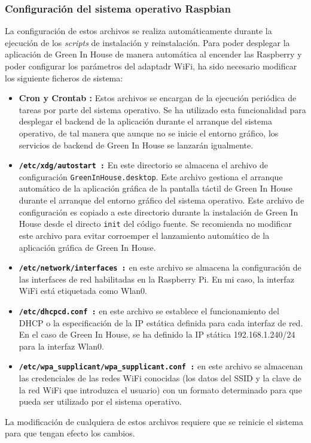         \subsubsection{Configuración del sistema operativo Raspbian}
        La configuración de estos archivos se realiza automáticamente durante la ejecución de los \textit{scripts} de instalación y reinstalación. Para poder desplegar la aplicación de Green In House de manera automática al encender las Raspberry y poder configurar los parámetros del adaptadr WiFi, ha sido necesario modificar los siguiente ficheros de sistema: 
        \begin{itemize}
            \item \textbf{Cron y Crontab :} Estos archivos se encargan de la ejecución periódica de tareas por parte del sistema operativo. Se ha utilizado esta funcionalidad para desplegar el backend de la aplicación durante el arranque del sistema operativo, de tal manera que aunque no se inicie el entorno gráfico, los servicios de backend de Green In House se lanzarán igualmente.
            \item \textbf{\texttt{/etc/xdg/autostart :}} En este directorio se almacena el archivo de configuración \texttt{GreenInHouse.desktop}. Este archivo gestiona el arranque automático de la aplicación gráfica de la pantalla táctil de Green In House durante el arranque del entorno gráfico del sistema operativo. Este archivo de configuración es copiado a este directorio durante la instalación de Green In House desde el directo \texttt{init} del código fuente. Se recomienda no modificar este archivo para evitar corroemper el lanzamiento automático de la aplicación gráfica de Green In House.
            \item \textbf{\texttt{/etc/network/interfaces :}} en este archivo se almacena la configuración de las interfaces de red habilitadas en la Raspberry Pi. En mi caso, la interfaz WiFi está etiquetada como Wlan0.
            \item \textbf{\texttt{/etc/dhcpcd.conf :}} en este archivo se establece el funcionamiento del DHCP o la especificación de la IP estática definida para cada interfaz de red. En el caso de Green In House, se ha definido la IP stática 192.168.1.240/24 para la interfaz Wlan0.
            \item \textbf{\texttt{/etc/wpa\_supplicant/wpa\_supplicant.conf :}} en este archivo se almacenan las credenciales de las redes WiFi conocidas (los datos del SSID y la clave de la red WiFi que introduzca el usuario) con un formato determinado para que pueda ser utilizado por el sistema operativo.
        \end{itemize}
        La modificación de cualquiera de estos archivos requiere que se reinicie el sistema para que tengan efecto los cambios.

